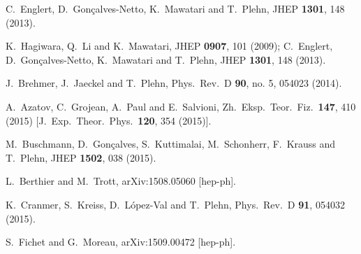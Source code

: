   C.~Englert, D.~Gon\c{c}alves-Netto, K.~Mawatari and T.~Plehn,
  JHEP {\bf 1301}, 148 (2013).

  K.~Hagiwara, Q.~Li and K.~Mawatari,
  JHEP {\bf 0907}, 101 (2009);
  C.~Englert, D.~Gon\c{c}alves-Netto, K.~Mawatari and T.~Plehn,
  JHEP {\bf 1301}, 148 (2013).
  
  J.~Brehmer, J.~Jaeckel and T.~Plehn,
  Phys.\ Rev.\ D {\bf 90}, no. 5, 054023 (2014).
  
  A.~Azatov, C.~Grojean, A.~Paul and E.~Salvioni,
  Zh.\ Eksp.\ Teor.\ Fiz.\  {\bf 147}, 410 (2015)
  [J.\ Exp.\ Theor.\ Phys.\  {\bf 120}, 354 (2015)].
  
  M.~Buschmann, D.~Gon\c{c}alves, S.~Kuttimalai, M.~Schonherr, F.~Krauss and T.~Plehn,
  JHEP {\bf 1502}, 038 (2015).
  
  L.~Berthier and M.~Trott,
  arXiv:1508.05060 [hep-ph].

  K.~Cranmer, S.~Kreiss, D.~L\'opez-Val and T.~Plehn,
  Phys.\ Rev.\ D {\bf 91}, 054032 (2015).

  S.~Fichet and G.~Moreau,
  arXiv:1509.00472 [hep-ph].

